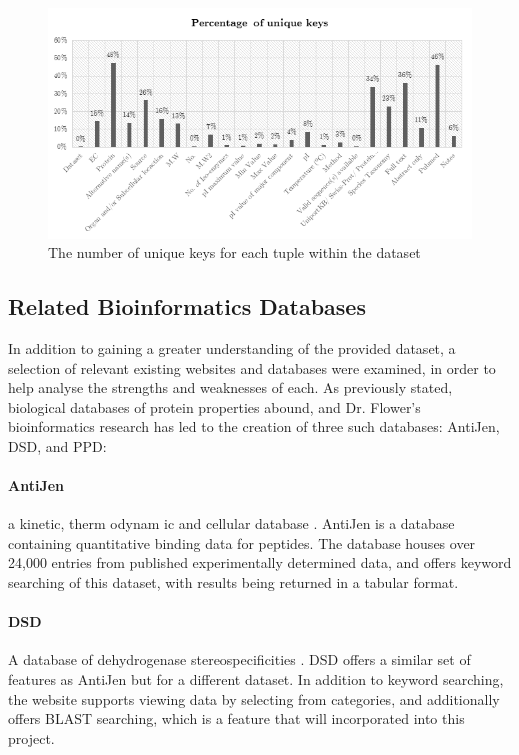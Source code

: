 \begin{figure}[H]
\centering
\includegraphics{assets/chart-dataset-unique.png}
\caption{The number of unique keys for each tuple within the dataset}
\label{fig:chart-dataset-unique}
\end{figure}

\newpage
\subsection{Related Bioinformatics Databases}
In addition to gaining a greater understanding of the provided dataset, a
selection of relevant existing websites and databases were examined, in order to
help analyse the strengths and weaknesses of each. As previously stated,
biological databases of protein properties abound, and Dr. Flower's
bioinformatics research has led to the creation of three such databases:
AntiJen, DSD, and PPD:

\paragraph{AntiJen} a kinetic, therm odynam ic and cellular database
\cite{DDG1999}. AntiJen is a database containing quantitative binding data for
peptides. The database houses over 24,000 entries from published experimentally
determined data, and offers keyword searching of this dataset, with results
being returned in a tabular format.

\paragraph{DSD} A database of dehydrogenase stereospecificities
\cite{DDGND}. DSD offers a similar set of features as AntiJen but for a
different dataset. In addition to keyword searching, the website supports
viewing data by selecting from categories, and additionally offers BLAST
searching, which is a feature that will incorporated into this project.

